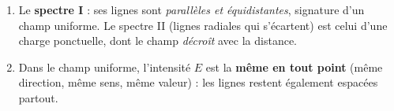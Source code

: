 \documentclass[11pt,a4paper]{article}
\begin{document}
\begin{corrige}
\begin{enumerate}[label=\alph*)]
  \item Le \textbf{spectre I} : ses lignes sont \emph{parallèles et équidistantes}, signature d'un
        champ uniforme. Le spectre II (lignes radiales qui s'écartent) est celui d'une charge
        ponctuelle, dont le champ \emph{décroît} avec la distance.
  \item Dans le champ uniforme, l'intensité $E$ est la \textbf{même en tout point} (même direction,
        même sens, même valeur) : les lignes restent également espacées partout.
\end{enumerate}
\end{corrige}
\end{document}
